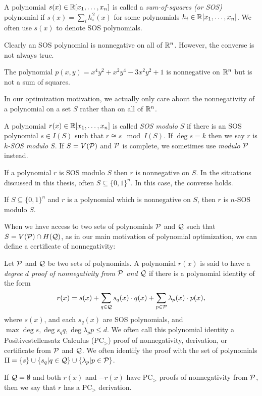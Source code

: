 \begin{definition}
A polynomial $s(x) \in \mathbb R[x_1,\dots,x_n]$ is called a \emph{sum-of-squares (or SOS)} polynomial if $s(x) = \sum_i h_i^2(x)$ for some polynomials $h_i \in \mathbb R[x_1,\dots,x_n]$. We often use $s(x)$ to denote SOS polynomials. 
\end{definition}

Clearly an SOS polynomial is nonnegative on all of $\mathbb R^n$. However, the converse is not always true.
\begin{fact}
The polynomial $p(x,y) = x^4y^2 + x^2y^4 - 3x^2y^2 + 1$ is nonnegative on $\mathbb R^n$ but is not a sum of squares.
\end{fact}

In our optimization motivation, we actually only care about the nonnegativity of a polynomial on a set $S$ rather than on all of $\mathbb R^n$. 

\begin{definition}
A polynomial $r(x) \in \mathbb R[x_1,\dots,x_n]$ is called \emph{SOS modulo $S$} if there is an SOS polynomial $s \in I(S)$ such that $r \cong s \mod I(S)$. If $\deg s = k$ then we say $r$ is \emph{$k$-SOS modulo $S$}. If $S = V(\mathcal P)$ and $\mathcal P$ is complete, we sometimes use \emph{modulo $\mathcal P$} instead.
\end{definition}
If a polynomial $r$ is SOS modulo $S$ then $r$ is nonnegative on $S$. In the situations discussed in this thesis, often $S \subseteq \{0,1\}^n$. In this case, the converse holds.
\begin{fact}\label{fact:boolSOS}
If $S \subseteq \{0,1\}^n$ and $r$ is a polynomial which is nonnegative on $S$, then $r$ is $n$-SOS modulo $S$. 
\end{fact}

When we have access to two sets of polynomials $\mathcal P$ and $\mathcal Q$ such that $S = V(\mathcal P) \cap H(\mathcal Q)$, as in our main motivation of polynomial optimization, we can define a certificate of nonnegativity:

\begin{definition}
Let $\mathcal P$ and $\mathcal Q$ be two sets of polynomials. A polynomial $r(x)$ is said to have a \emph{degree $d$ proof of nonnegativity from $\mathcal P$ and $\mathcal Q$} if there is a polynomial identity of the form
\[r(x) = s(x) + \sum_{q \in \mathcal Q} s_q(x) \cdot q(x) + \sum_{p \in \mathcal P} \lambda_p(x) \cdot p(x),\]
where $s(x)$, and each $s_q(x)$ are SOS polynomials, and $\max{\deg s, \deg s_qq, \deg \lambda_pp} \leq d$. We often call this polynomial identity a Positivestellensatz Calculus (PC$_>$) proof of nonnegativity, derivation, or certificate from $\mathcal P$ and $\mathcal Q$.
We often identify the proof with the set of polynomials $\Pi = \{s\} \cup \{s_q | q\in \mathcal Q\} \cup \{\lambda_p | p \in \mathcal P\}$.

If $\mathcal Q = \emptyset$ and both $r(x)$ and $-r(x)$ have PC$_>$ proofs of nonnegativity from $\mathcal P$, then we say that $r$ has a PC$_>$ derivation.
\end{definition}

